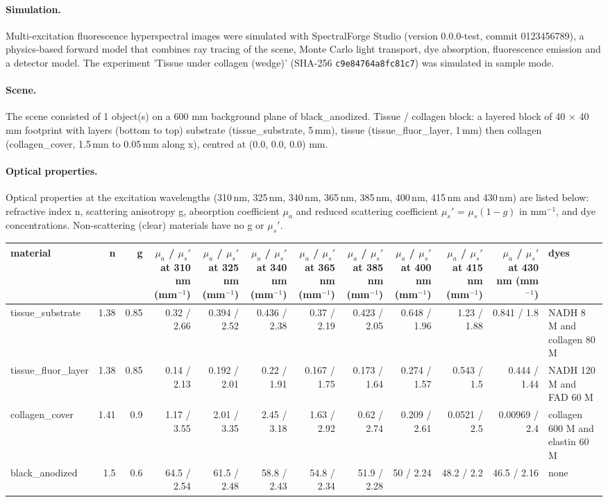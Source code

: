 \paragraph{Simulation.} Multi-excitation fluorescence hyperspectral images were simulated with SpectralForge Studio (version 0.0.0-test, commit 0123456789), a physics-based forward model that combines ray tracing of the scene, Monte Carlo light transport, dye absorption, fluorescence emission and a detector model. The experiment 'Tissue under collagen (wedge)' (SHA-256 \texttt{c9e84764a8fc81c7}) was simulated in sample mode.

\paragraph{Scene.} The scene consisted of 1 object(s) on a 600 mm background plane of black\_anodized. Tissue / collagen block: a layered block of 40 × 40 mm footprint with layers (bottom to top) substrate (tissue\_substrate, 5\,mm), tissue (tissue\_fluor\_layer, 1\,mm) then collagen (collagen\_cover, 1.5\,mm to 0.05\,mm along x), centred at (0.0, 0.0, 0.0) mm.

\paragraph{Optical properties.} Optical properties at the excitation wavelengths (310\,nm, 325\,nm, 340\,nm, 365\,nm, 385\,nm, 400\,nm, 415\,nm and 430\,nm) are listed below: refractive index n, scattering anisotropy g, absorption coefficient $\mu_a$ and reduced scattering coefficient $\mu_s'$ = $\mu_s(1-g)$ in mm$^{-1}$, and dye concentrations. Non-scattering (clear) materials have no g or $\mu_s'$.

\begin{tabular}{lrrrrrrrrrrl}
\hline material & n & g & $\mu_a$ / $\mu_s'$ at 310 nm (mm$^{-1}$) & $\mu_a$ / $\mu_s'$ at 325 nm (mm$^{-1}$) & $\mu_a$ / $\mu_s'$ at 340 nm (mm$^{-1}$) & $\mu_a$ / $\mu_s'$ at 365 nm (mm$^{-1}$) & $\mu_a$ / $\mu_s'$ at 385 nm (mm$^{-1}$) & $\mu_a$ / $\mu_s'$ at 400 nm (mm$^{-1}$) & $\mu_a$ / $\mu_s'$ at 415 nm (mm$^{-1}$) & $\mu_a$ / $\mu_s'$ at 430 nm (mm$^{-1}$) & dyes \\ \hline
tissue\_substrate & 1.38 & 0.85 & 0.32 / 2.66 & 0.394 / 2.52 & 0.436 / 2.38 & 0.37 / 2.19 & 0.423 / 2.05 & 0.648 / 1.96 & 1.23 / 1.88 & 0.841 / 1.8 & NADH 8 \textmu{}M and collagen 80 \textmu{}M \\
tissue\_fluor\_layer & 1.38 & 0.85 & 0.14 / 2.13 & 0.192 / 2.01 & 0.22 / 1.91 & 0.167 / 1.75 & 0.173 / 1.64 & 0.274 / 1.57 & 0.543 / 1.5 & 0.444 / 1.44 & NADH 120 \textmu{}M and FAD 60 \textmu{}M \\
collagen\_cover & 1.41 & 0.9 & 1.17 / 3.55 & 2.01 / 3.35 & 2.45 / 3.18 & 1.63 / 2.92 & 0.62 / 2.74 & 0.209 / 2.61 & 0.0521 / 2.5 & 0.00969 / 2.4 & collagen 600 \textmu{}M and elastin 60 \textmu{}M \\
black\_anodized & 1.5 & 0.6 & 64.5 / 2.54 & 61.5 / 2.48 & 58.8 / 2.43 & 54.8 / 2.34 & 51.9 / 2.28 & 50 / 2.24 & 48.2 / 2.2 & 46.5 / 2.16 & none \\
\hline \end{tabular}

